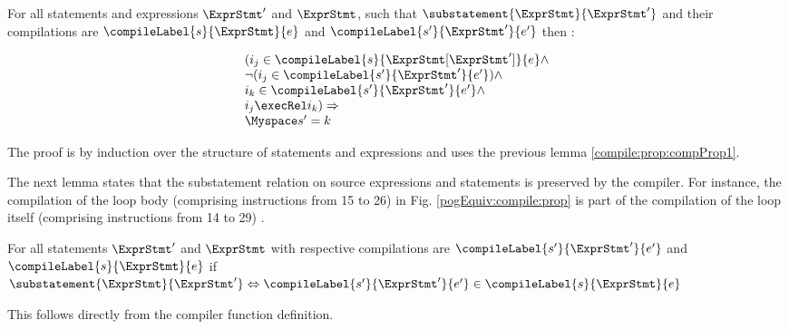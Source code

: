 \begin{compProp2}\label{compile:prop:compProp2}
 For all  statements and expressions $\ExprStmt'$  and $\ExprStmt$, such that $\substatement{\ExprStmt }{\ExprStmt'} $
and their  compilations  are $\compileLabel{s}{\ExprStmt}{e}$ and  $\compileLabel{s'}{\ExprStmt'}{e'}$  then :




$$\begin{array}{l} %
                        (  i_j \in \compileLabel{s}{\ExprStmt[\ExprStmt']}{e} \wedge\\
		        \neg (i_j \in \compileLabel{s'}{\ExprStmt'}{e'} )   \wedge \\
		        i_k \in \compileLabel{s'}{\ExprStmt'}{e'}  \wedge \\
		        
		       i_j \execRel i_k )  \Rightarrow \\ 
		       \Myspace  s' = k 


  \end{array}$$ 

\end{compProp2}
The proof is by induction over the structure of statements and expressions  and uses the previous lemma \ref{compile:prop:compProp1}.


 
The next lemma  states that the substatement relation on source expressions and statements is preserved
by the compiler. For instance, the compilation of the loop body (comprising instructions from 15 to 26) in Fig. \ref{pogEquiv:compile:prop}  
is part of the compilation of the loop itself (comprising instructions from 14 to 29) .

\begin{compProp11}\label{compile:prop:compPropSubstmt}
For all statements $\ExprStmt'$ and $\ExprStmt $ with
respective compilations are $\compileLabel{s'}{\ExprStmt'}{e'}$ and  $\compileLabel{s}{\ExprStmt}{e}$ 
if 
  $  \substatement{\ExprStmt }{\ExprStmt'} \Leftrightarrow \compileLabel{s'}{\ExprStmt'}{e'} \in  \compileLabel{s}{\ExprStmt}{e} $ 
\end{compProp11}
This follows directly from the compiler function definition.

